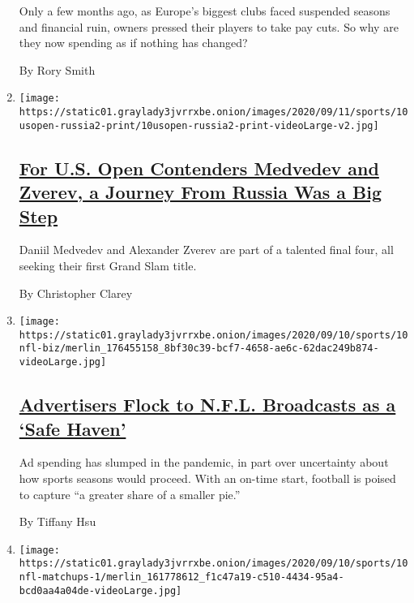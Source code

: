 \begin{enumerate}
  Only a few months ago, as Europe's biggest clubs faced suspended
  seasons and financial ruin, owners pressed their players to take pay
  cuts. So why are they now spending as if nothing has changed?

  By Rory Smith
\item
  \texttt{[image: https://static01.graylady3jvrrxbe.onion/images/2020/09/11/sports/10usopen-russia2-print/10usopen-russia2-print-videoLarge-v2.jpg]}

  \hypertarget{for-us-open-contenders-medvedev-and-zverev-a-journey-from-russia-was-a-big-step}{%
  \subsection{\texorpdfstring{\href{/2020/09/11/sports/tennis/us-open-daniil-medvedev-alexander-zverev.html}{For
  U.S. Open Contenders Medvedev and Zverev, a Journey From Russia Was a
  Big
  Step}}{For U.S. Open Contenders Medvedev and Zverev, a Journey From Russia Was a Big Step}}\label{for-us-open-contenders-medvedev-and-zverev-a-journey-from-russia-was-a-big-step}}

  Daniil Medvedev and Alexander Zverev are part of a talented final
  four, all seeking their first Grand Slam title.

  By Christopher Clarey
\item
  \texttt{[image: https://static01.graylady3jvrrxbe.onion/images/2020/09/10/sports/10nfl-biz/merlin\_176455158\_8bf30c39-bcf7-4658-ae6c-62dac249b874-videoLarge.jpg]}

  \hypertarget{advertisers-flock-to-nfl-broadcasts-as-a-safe-haven}{%
  \subsection{\texorpdfstring{\href{/2020/09/10/sports/football/nfl-tv-broadcast-ads.html}{Advertisers
  Flock to N.F.L. Broadcasts as a `Safe
  Haven'}}{Advertisers Flock to N.F.L. Broadcasts as a `Safe Haven'}}\label{advertisers-flock-to-nfl-broadcasts-as-a-safe-haven}}

  Ad spending has slumped in the pandemic, in part over uncertainty
  about how sports seasons would proceed. With an on-time start,
  football is poised to capture ``a greater share of a smaller pie.''

  By Tiffany Hsu
\item
  \texttt{[image: https://static01.graylady3jvrrxbe.onion/images/2020/09/10/sports/10nfl-matchups-1/merlin\_161778612\_f1c47a19-c510-4434-95a4-bcd0aa4a04de-videoLarge.jpg]}


\end{enumerate}
